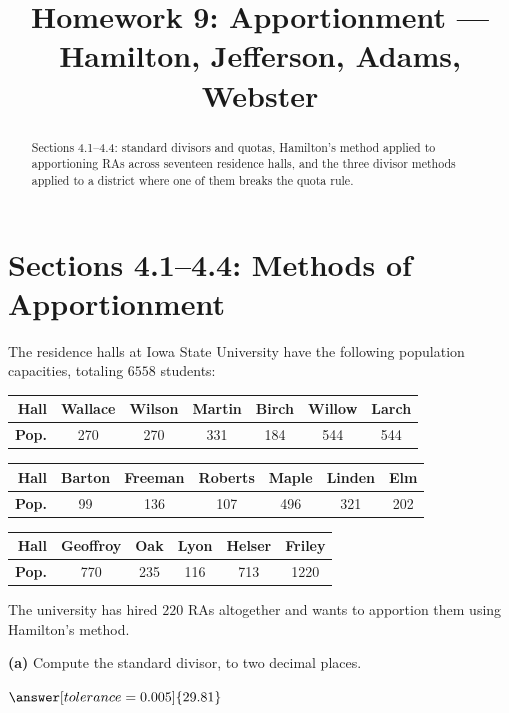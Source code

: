 \documentclass[12pt]{ximera}
\title{Homework 9: Apportionment --- Hamilton, Jefferson, Adams, Webster}
\begin{document}
\begin{abstract}
Sections 4.1--4.4: standard divisors and quotas, Hamilton's method applied to
apportioning RAs across seventeen residence halls, and the three divisor methods
applied to a district where one of them breaks the quota rule.
\end{abstract}
\maketitle

\section*{Sections 4.1--4.4: Methods of Apportionment}

\begin{problem}
The residence halls at Iowa State University have the following population capacities,
totaling $6558$ students:

\begin{center}
\begin{tabular}{r|c|c|c|c|c|c}
\textbf{Hall} & Wallace & Wilson & Martin & Birch & Willow & Larch \\\hline
\textbf{Pop.} & 270 & 270 & 331 & 184 & 544 & 544 \\
\end{tabular}

\smallskip
\begin{tabular}{r|c|c|c|c|c|c}
\textbf{Hall} & Barton & Freeman & Roberts & Maple & Linden & Elm \\\hline
\textbf{Pop.} & 99 & 136 & 107 & 496 & 321 & 202 \\
\end{tabular}

\smallskip
\begin{tabular}{r|c|c|c|c|c}
\textbf{Hall} & Geoffroy & Oak & Lyon & Helser & Friley \\\hline
\textbf{Pop.} & 770 & 235 & 116 & 713 & 1220 \\
\end{tabular}
\end{center}

The university has hired $220$ RAs altogether and wants to apportion them using
Hamilton's method.

\begin{prompt}
\textbf{(a)} Compute the standard divisor, to two decimal places.

$\answer[tolerance=0.005]{29.81}$


\end{prompt}
\end{problem}
\end{document}
